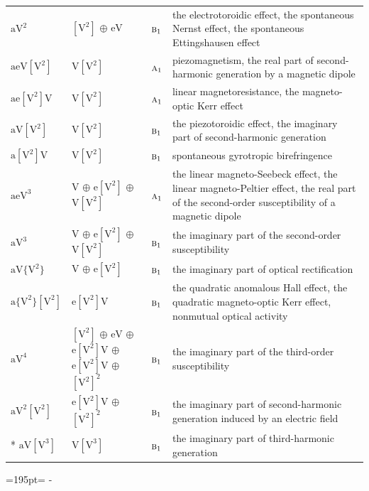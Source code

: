 \documentclass[10pt,a4paper]{article}
\newcommand{\needspace}[1]{\par\penalty-100\begingroup\dimen0=#1\relax\dimen2=\pagegoal
  \advance\dimen2-\pagetotal\ifdim\dimen0>\dimen2\relax\ifdim\dimen2>0pt\vfil\break\fi\fi
  \endgroup}
\numberwithin{equation}{section}
\newcommand{\irr}[1]{\text{\normalfont\scshape #1}}
\newcommand{\jahn}[1]{\mathrm{#1}}
\newlength{\fillwidth}\newlength{\cellwidth}\newlength{\colwidth}
\begin{document}
{\begin{longtable}{@{}lll>{\RaggedRight\arraybackslash}p{\fillwidth}@{}}
$\jahn{aV^{2}}$ & $\jahn{[V^{2}]}$ $\oplus$ $\jahn{eV}$ & $\irr{b}_{1}$ & the electrotoroidic effect, the spontaneous Nernst effect, the spontaneous Ettingshausen effect\\
$\jahn{aeV[V^{2}]}$ & $\jahn{V[V^{2}]}$ & $\irr{a}_{1}$ & piezomagnetism, the real part of second-harmonic generation by a magnetic dipole\\
$\jahn{ae[V^{2}]V}$ & $\jahn{V[V^{2}]}$ & $\irr{a}_{1}$ & linear magnetoresistance, the magneto-optic Kerr effect\\
$\jahn{aV[V^{2}]}$ & $\jahn{V[V^{2}]}$ & $\irr{b}_{1}$ & the piezotoroidic effect, the imaginary part of second-harmonic generation\\
$\jahn{a[V^{2}]V}$ & $\jahn{V[V^{2}]}$ & $\irr{b}_{1}$ & spontaneous gyrotropic birefringence\\
$\jahn{aeV^{3}}$ & $\jahn{V}$ $\oplus$ $\jahn{e[V^{2}]}$ $\oplus$ $\jahn{V[V^{2}]}$ & $\irr{a}_{1}$ & the linear magneto-Seebeck effect, the linear magneto-Peltier effect, the real part of the second-order susceptibility of a magnetic dipole\\
$\jahn{aV^{3}}$ & $\jahn{V}$ $\oplus$ $\jahn{e[V^{2}]}$ $\oplus$ $\jahn{V[V^{2}]}$ & $\irr{b}_{1}$ & the imaginary part of the second-order susceptibility\\
$\jahn{aV\{V^{2}\}}$ & $\jahn{V}$ $\oplus$ $\jahn{e[V^{2}]}$ & $\irr{b}_{1}$ & the imaginary part of optical rectification\\
$\jahn{a\{V^{2}\}[V^{2}]}$ & $\jahn{e[V^{2}]V}$ & $\irr{b}_{1}$ & the quadratic anomalous Hall effect, the quadratic magneto-optic Kerr effect, nonmutual optical activity\\
$\jahn{aV^{4}}$ & $\jahn{[V^{2}]}$ $\oplus$ $\jahn{eV}$ $\oplus$ $\jahn{e[V^{2}]V}$ $\oplus$ $\jahn{e[V^{2}]V}$ $\oplus$ $\jahn{[V^{2}]^{2}}$ & $\irr{b}_{1}$ & the imaginary part of the third-order susceptibility\\
$\jahn{aV^{2}[V^{2}]}$ & $\jahn{e[V^{2}]V}$ $\oplus$ $\jahn{[V^{2}]^{2}}$ & $\irr{b}_{1}$ & the imaginary part of second-harmonic generation induced by an electric field\\*
$\jahn{aV[V^{3}]}$ & $\jahn{V[V^{3}]}$ & $\irr{b}_{1}$ & the imaginary part of third-harmonic generation\\
\bottomrule\end{longtable}}
\needspace{195pt}
\end{document}
